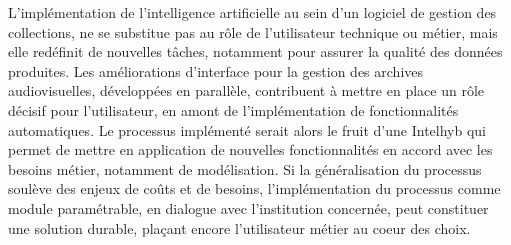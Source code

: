 \documentclass[12pt,twoside]{book}
\begin{document}







L'implémentation de l'intelligence artificielle au sein d'un logiciel de gestion des collections, ne se substitue pas au rôle de l'utilisateur technique ou métier, mais elle redéfinit de nouvelles tâches, notamment pour assurer la qualité des données produites. Les améliorations d'interface pour la gestion des archives audiovisuelles, développées en parallèle, contribuent à mettre en place un rôle décisif pour l'utilisateur, en amont de l'implémentation de fonctionnalités automatiques. Le processus implémenté serait alors le fruit d'une \gls{Intelhyb} qui permet de mettre en application de nouvelles fonctionnalités en accord avec les besoins métier, notamment de modélisation. Si la généralisation du processus soulève des enjeux de coûts et de besoins, l'implémentation du processus comme module paramétrable, en dialogue avec l'institution concernée, peut constituer une solution durable, plaçant encore l'utilisateur métier au coeur des choix. 









\appendix 



\newpage{\pagestyle{empty}\cleardoublepage}


\backmatter 

\printglossary[title=Glossaire]
\printglossary[type=\acronymtype, title={Liste des acronymes}]

\listoftables
\listoffigures
\tableofcontents
\end{document}
